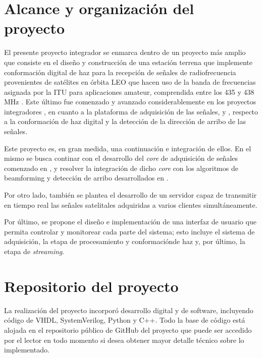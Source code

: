 \documentclass[../../main.tex]{subfiles}
\begin{document}

\section{Alcance y organización del proyecto}
El presente proyecto integrador se enmarca dentro de un proyecto más amplio que consiste en el diseño y construcción de una estación terrena que implemente conformación digital de haz 
para la recepción de señales de radiofrecuencia provenientes de satélites en órbita LEO que hacen uso de la banda de frecuencias asignada por la ITU para aplicaciones amateur, comprendida entre los 435 y 438 MHz \cite{itu-banda-amateur}.
Este último fue comenzado y avanzado considerablemente en los proyectos integradores \cite{proyecto-jose}, en cuanto a la plataforma de adquisición de las señales, y \cite{proyecto-grigo}, respecto a la conformación de haz digital y la detección de la dirección de arribo de las señales. 

Este proyecto es, en gran medida, una continuación e integración de ellos. En el mismo se busca continar con el desarrollo del \textit{core} de adquisición de señales comenzado en \cite{proyecto-jose}, y resolver la integración de dicho \textit{core} con los algoritmos de beamforming y detección de arribo desarrollados en \cite{proyecto-grigo}.

Por otro lado, también se plantea el desarrollo de un servidor capaz de transmitir en tiempo real las señales satelitales adquiridas a varios clientes simultáneamente.

Por último, se propone el diseño e implementación de una interfaz de usuario que permita controlar y monitorear cada parte del sistema; esto incluye el sistema de adquisición, la etapa de procesamiento y conformaciónde haz y, por último, la etapa de \textit{streaming}.

\section{Repositorio del proyecto}
La realización del proyecto incorporó desarrollo digital y de software, incluyendo código de VHDL, SystemVerilog, Python y C++. Todo la base de código está alojada en el repositorio público de GitHub del proyecto \cite{github} que puede ser accedido por el lector en todo momento si desea obtener mayor detalle técnico sobre lo implementado.
\end{document}
